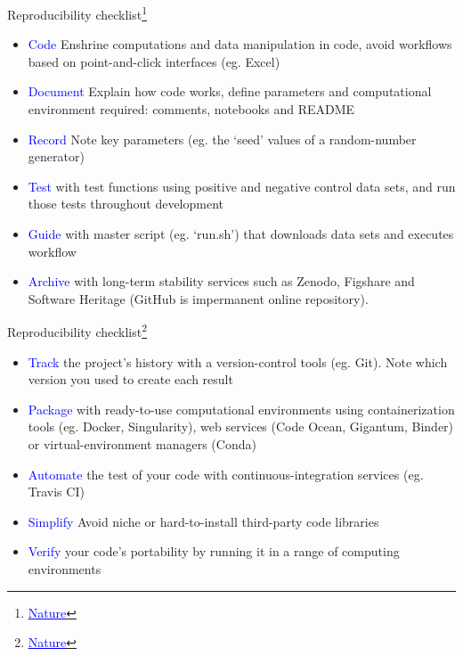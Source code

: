 \begin{frame}{Reproducibility checklist\footnote{\href{https://www.nature.com/articles/d41586-020-02462-7}{\textcolor{blue}{\underline{Nature}}}}}

\begin{itemize}
    \item \textcolor{blue}{Code} Enshrine computations and data manipulation in code, avoid workflows based on point-and-click interfaces (eg. Excel)
    \item \textcolor{blue}{Document} Explain how code works, define parameters and computational environment required: comments, notebooks and README
    \item \textcolor{blue}{Record} Note key parameters (eg. the ‘seed’ values of a random-number generator)
    \item \textcolor{blue}{Test} with test functions using positive and negative control data sets, and run those tests throughout development
    \item \textcolor{blue}{Guide} with master script (eg. ‘run.sh’) that downloads data sets and executes workflow
    \item \textcolor{blue}{Archive} with long-term stability services such as Zenodo, Figshare and Software Heritage (GitHub is impermanent online repository).
\end{itemize}
\end{frame}

\begin{frame}{Reproducibility checklist\footnote{\href{https://www.nature.com/articles/d41586-020-02462-7}{\textcolor{blue}{\underline{Nature}}}}}

\begin{itemize}
    \item \textcolor{blue}{Track} the project’s history with a version-control tools (eg. Git). Note which version you used to create each result
    \item \textcolor{blue}{Package} with ready-to-use computational environments using containerization tools (eg. Docker, Singularity), web services (Code Ocean, Gigantum, Binder) or virtual-environment managers (Conda)
    \item \textcolor{blue}{Automate} the test of your code with continuous-integration services (eg. Travis CI)
    \item \textcolor{blue}{Simplify} Avoid niche or hard-to-install third-party code libraries
    \item \textcolor{blue}{Verify} your code’s portability by running it in a range of computing environments
\end{itemize}
\end{frame}    

